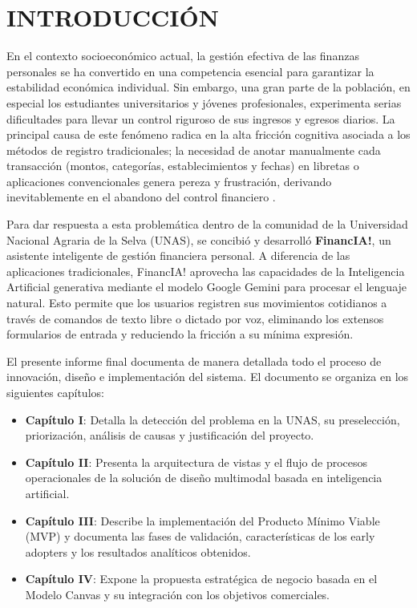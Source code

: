 \documentclass[12pt]{article}
\begin{document}
\section*{INTRODUCCIÓN}
En el contexto socioeconómico actual, la gestión efectiva de las finanzas personales se ha convertido en una competencia esencial para garantizar la estabilidad económica individual. Sin embargo, una gran parte de la población, en especial los estudiantes universitarios y jóvenes profesionales, experimenta serias dificultades para llevar un control riguroso de sus ingresos y egresos diarios. La principal causa de este fenómeno radica en la alta fricción cognitiva asociada a los métodos de registro tradicionales; la necesidad de anotar manualmente cada transacción (montos, categorías, establecimientos y fechas) en libretas o aplicaciones convencionales genera pereza y frustración, derivando inevitablemente en el abandono del control financiero \cite{norman2013design}.

Para dar respuesta a esta problemática dentro de la comunidad de la Universidad Nacional Agraria de la Selva (UNAS), se concibió y desarrolló \textbf{FinancIA!}, un asistente inteligente de gestión financiera personal. A diferencia de las aplicaciones tradicionales, FinancIA! aprovecha las capacidades de la Inteligencia Artificial generativa mediante el modelo Google Gemini \cite{gemini2023} para procesar el lenguaje natural. Esto permite que los usuarios registren sus movimientos cotidianos a través de comandos de texto libre o dictado por voz, eliminando los extensos formularios de entrada y reduciendo la fricción a su mínima expresión.

El presente informe final documenta de manera detallada todo el proceso de innovación, diseño e implementación del sistema. El documento se organiza en los siguientes capítulos:
\begin{itemize}
    \item \textbf{Capítulo I}: Detalla la detección del problema en la UNAS, su preselección, priorización, análisis de causas y justificación del proyecto.
    \item \textbf{Capítulo II}: Presenta la arquitectura de vistas y el flujo de procesos operacionales de la solución de diseño multimodal basada en inteligencia artificial.
    \item \textbf{Capítulo III}: Describe la implementación del Producto Mínimo Viable (MVP) y documenta las fases de validación, características de los early adopters y los resultados analíticos obtenidos.
    \item \textbf{Capítulo IV}: Expone la propuesta estratégica de negocio basada en el Modelo Canvas y su integración con los objetivos comerciales.
\end{itemize}
\end{document}
